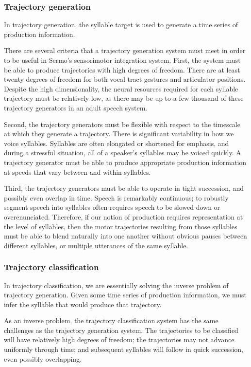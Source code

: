 \subsubsection{Trajectory generation}

In trajectory generation,
the syllable target
is used to generate
a time series of production information.

There are several criteria
that a trajectory generation system
must meet in order to be
useful in Sermo's sensorimotor integration system.
First, the system must be able to produce
trajectories with high degrees of freedom.
There are at least twenty degrees of freedom
for both vocal tract gestures
and articulator positions.
Despite the high dimensionality,
the neural resources required
for each syllable trajectory
must be relatively low,
as there may be up to a few thousand
of these trajectory generators
in an adult speech system.

Second, the trajectory generators
must be flexible with respect to
the timescale at which
they generate a trajectory.
There is significant variability
in how we voice syllables.
Syllables are often elongated
or shortened for emphasis,
and during a stressful situation,
all of a speaker's syllables may be
voiced quickly.
A trajectory generator must be
able to produce appropriate
production information
at speeds that vary
between and within syllables.

Third, the trajectory generators
must be able to operate
in tight succession,
and possibly even overlap in time.
Speech is remarkably continuous;
to robustly segment speech into
syllables often requires
speech to be slowed down
or overenunciated.
Therefore, if our notion of production
requires representation at the level of syllables,
then the motor trajectories
resulting from those syllables
must be able to blend naturally into one another
without obvious pauses between
different syllables,
or multiple utterances of the same syllable.

\subsubsection{Trajectory classification}

In trajectory classification,
we are essentially solving the inverse problem
of trajectory generation.
Given some time series of production information,
we must infer the syllable
that would produce that trajectory.

As an inverse problem,
the trajectory classification system
has the same challenges
as the trajectory generation system.
The trajectories to be classified
will have relatively high degrees of freedom;
the trajectories may not advance uniformly
through time;
and subsequent syllables will follow
in quick succession,
even possibly overlapping.


